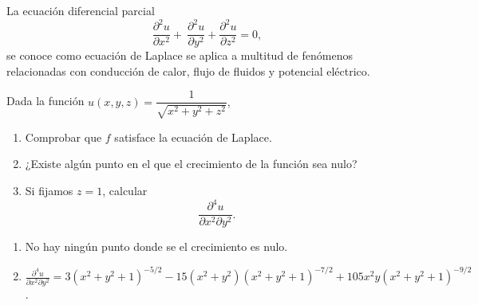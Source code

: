 {La ecuación diferencial parcial
\[
\displaystyle{\frac{\partial^2 u}{\partial x^2}} + \ \displaystyle{\frac{\partial^2 u}{\partial y^2}} + \displaystyle{\frac{\partial^2 u}{\partial z^2}} = 0,
\]
se conoce como ecuación de Laplace se aplica a multitud de fenómenos relacionadas con conducción de calor, flujo de fluidos y potencial eléctrico.

Dada la función $u(x,y,z)=\dfrac{1}{ \sqrt{x^2 + y^2 + z^2}},$
\begin{enumerate}
\item Comprobar que $f$ satisface la ecuación de Laplace.
\item ¿Existe algún punto en el que el crecimiento de la función sea nulo? 
\item Si fijamos $z=1$, calcular
\[
\frac{\partial^4u}{\partial x^2\partial y^2}.
\]
\end{enumerate}
}
{
\begin{enumerate}[start=2]
\item No hay ningún punto donde se el crecimiento es nulo.
\item $\frac{{\partial ^4 u}}{{\partial x^2 \partial y^2 }} =3\left( {x^2  + y^2  + 1} \right)^{ - 5/2}  - 15\left( {x^2  + y^2
} \right)\left( {x^2  + y^2 + 1} \right)^{ - 7/2}  + 105x^2 y\left({x^2  + y^2  + 1} \right)^{ - 9/2}$.
\end{enumerate}
}
